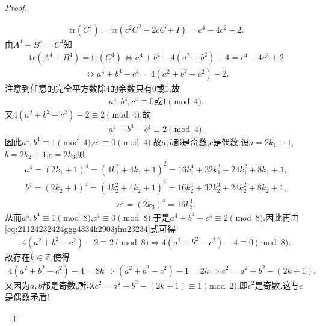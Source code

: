 \documentclass[../../main.tex]{subfiles}%
\begin{document}
\begin{proof}
\begin{enumerate}[(1)]
\begin{align*}
\mathrm{tr}(C^4) = \mathrm{tr}(c^2C^2 - 2cC + I) = c^4 - 4c^2 + 2.
\end{align*}
由$A^4 + B^4 = C^4$知
\begin{align*}
\mathrm{tr}(A^4 + B^4) = \mathrm{tr}(C^4) \Longleftrightarrow a^4 + b^4 - 4(a^2 + b^2) + 4 = c^4 - 4c^2 + 2
\end{align*}
\begin{align}
\Longleftrightarrow a^4 + b^4 - c^4 = 4(a^2 + b^2 - c^2) - 2. \label{eq:21124232424ggg4334k2903jfm23234}
\end{align}
注意到任意的完全平方数除$4$的余数只有$0$或$1$,故
\begin{align*}
a^4, b^4, c^4 \equiv 0 \text{或} 1 \pmod{4}.
\end{align*}
又$4(a^2 + b^2 - c^2) - 2 \equiv 2 \pmod{4}$,故
\begin{align*}
a^4 + b^4 - c^4 \equiv 2 \pmod{4}.
\end{align*}
因此$a^4, b^4 \equiv 1 \pmod{4}$,$c^4 \equiv 0 \pmod{4}$.故$a,b$都是奇数,$c$是偶数.设$a = 2k_1 + 1$,$b = 2k_2 + 1$,$c = 2k_3$,则
\begin{align*}
a^4 = (2k_1 + 1)^4 = (4k_1^2 + 4k_1 + 1)^2 = 16k_1^4 + 32k_1^3 + 24k_1^2 + 8k_1 + 1,
\end{align*}
\begin{align*}
b^4 = (2k_2 + 1)^4 = (4k_2^2 + 4k_2 + 1)^2 = 16k_2^4 + 32k_2^3 + 24k_2^2 + 8k_2 + 1,
\end{align*}
\begin{align*}
c^4 = (2k_3)^4 = 16k_3^4.
\end{align*}
从而$a^4, b^4 \equiv 1 \pmod{8}$,$c^4 \equiv 0 \pmod{8}$.于是$a^4 + b^4 - c^4 \equiv 2 \pmod{8}$.因此再由\eqref{eq:21124232424ggg4334k2903jfm23234}式可得
\begin{align*}
4(a^2 + b^2 - c^2) - 2 \equiv 2 \pmod{8} \Longrightarrow 4(a^2 + b^2 - c^2) - 4 \equiv 0 \pmod{8}.
\end{align*}
故存在$k\in \mathbb{Z}$,使得
\begin{align*}
4(a^2 + b^2 - c^2) - 4 = 8k \Longrightarrow (a^2 + b^2 - c^2) - 1 = 2k \Longrightarrow c^2 = a^2 + b^2 - (2k + 1).
\end{align*}
又因为$a,b$都是奇数,所以$c^2 = a^2 + b^2 - (2k + 1) \equiv 1 \pmod{2}$,即$c^2$是奇数.这与$c$是偶数矛盾!


\end{enumerate}
\end{proof}
\end{document}
